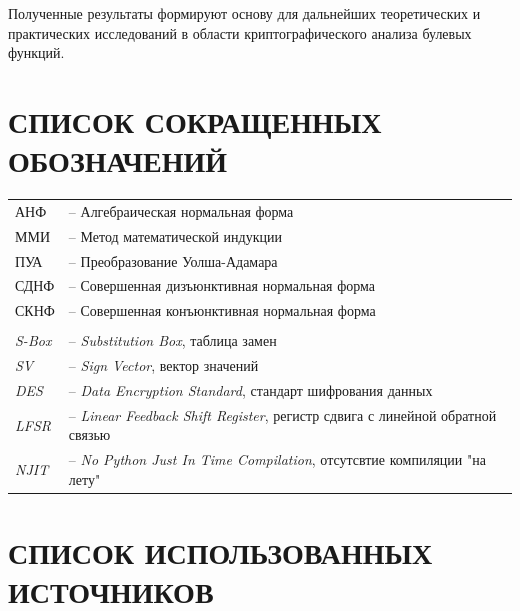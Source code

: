 Полученные результаты формируют основу для дальнейших теоретических и практических исследований в области криптографического анализа булевых функций.
\newpage 
\section*{СПИСОК СОКРАЩЕННЫХ ОБОЗНАЧЕНИЙ}
{
\setlength{\parindent}{0pt}
\begin{flushleft}
\begin{tabular}{@{}ll}
АНФ &– Алгебраическая нормальная форма\\

ММИ &– Метод математической индукции\\

ПУА &– Преобразование Уолша-Адамара\\ 

СДНФ &– Совершенная дизъюнктивная нормальная форма\\

СКНФ &– Совершенная конъюнктивная нормальная форма\\
\mbox{}\\
\textit{S-Box} &– \textit{Substitution Box}, таблица замен\\
\textit{SV} &– \textit{Sign Vector}, вектор значений\\
\textit{DES} &– \textit{Data Encryption Standard},  стандарт шифрования данных\\
\textit{LFSR} &– \textit{Linear Feedback Shift Register}, регистр сдвига с линейной обратной связью\\
\textit{NJIT} &– \textit{No Python Just In Time Compilation}, отсутсвтие компиляции "на лету"
\end{tabular}
\end{flushleft}
}

\newpage 
\section*{СПИСОК ИСПОЛЬЗОВАННЫХ ИСТОЧНИКОВ}
\renewcommand{\refname}{\vspace*{-3em}}  %

